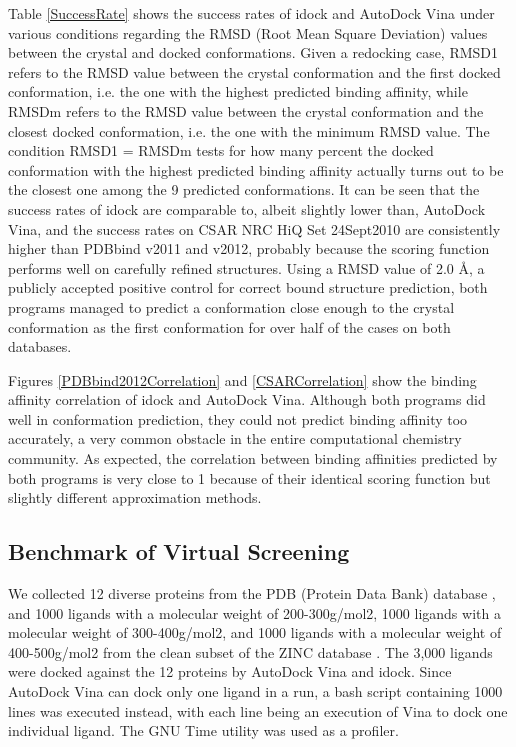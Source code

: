 \documentclass[10pt]{article}
\begin{document}
Table \ref{SuccessRate} shows the success rates of idock and AutoDock Vina under various conditions regarding the RMSD (Root Mean Square Deviation) values between the crystal and docked conformations. Given a redocking case, RMSD1 refers to the RMSD value between the crystal conformation and the first docked conformation, i.e. the one with the highest predicted binding affinity, while RMSDm refers to the RMSD value between the crystal conformation and the closest docked conformation, i.e. the one with the minimum RMSD value. The condition RMSD1 = RMSDm tests for how many percent the docked conformation with the highest predicted binding affinity actually turns out to be the closest one among the 9 predicted conformations. It can be seen that the success rates of idock are comparable to, albeit slightly lower than, AutoDock Vina, and the success rates on CSAR NRC HiQ Set 24Sept2010 are consistently higher than PDBbind v2011 and v2012, probably because the scoring function performs well on carefully refined structures. Using a RMSD value of 2.0 \AA, a publicly accepted positive control for correct bound structure prediction, both programs managed to predict a conformation close enough to the crystal conformation as the first conformation for over half of the cases on both databases.

Figures \ref{PDBbind2012Correlation} and \ref{CSARCorrelation} show the binding affinity correlation of idock and AutoDock Vina. Although both programs did well in conformation prediction, they could not predict binding affinity too accurately, a very common obstacle in the entire computational chemistry community. As expected, the correlation between binding affinities predicted by both programs is very close to 1 because of their identical scoring function but slightly different approximation methods.

\subsection*{Benchmark of Virtual Screening}
We collected 12 diverse proteins from the PDB (Protein Data Bank) database \cite{540,537}, and 1000 ligands with a molecular weight of 200-300g/mol2, 1000 ligands with a molecular weight of 300-400g/mol2, and 1000 ligands with a molecular weight of 400-500g/mol2 from the clean subset of the ZINC database \cite{532,1178}. The 3,000 ligands were docked against the 12 proteins by AutoDock Vina and idock. Since AutoDock Vina can dock only one ligand in a run, a bash script containing 1000 lines was executed instead, with each line being an execution of Vina to dock one individual ligand. The GNU Time utility was used as a profiler.
\end{document}
